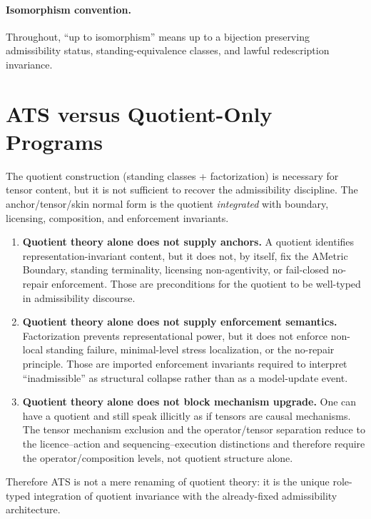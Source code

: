 \documentclass[12pt]{article}
\theoremstyle{plain}
\begin{document}
\paragraph{Isomorphism convention.}
Throughout, ``up to isomorphism'' means up to a bijection preserving admissibility status, standing-equivalence classes, and lawful redescription invariance.



\section{ATS versus Quotient-Only Programs}

The quotient construction (standing classes + factorization) is necessary for tensor content, but it is not sufficient to recover the admissibility discipline. The anchor/tensor/skin normal form is the quotient \emph{integrated} with boundary, licensing, composition, and enforcement invariants.

\begin{enumerate}[leftmargin=*]
\item \textbf{Quotient theory alone does not supply anchors.} A quotient identifies representation-invariant content, but it does not, by itself, fix the AMetric Boundary, standing terminality, licensing non-agentivity, or fail-closed no-repair enforcement. Those are preconditions for the quotient to be well-typed in admissibility discourse.

\item \textbf{Quotient theory alone does not supply enforcement semantics.} Factorization prevents representational power, but it does not enforce non-local standing failure, minimal-level stress localization, or the no-repair principle. Those are imported enforcement invariants required to interpret ``inadmissible'' as structural collapse rather than as a model-update event.

\item \textbf{Quotient theory alone does not block mechanism upgrade.} One can have a quotient and still speak illicitly as if tensors are causal mechanisms. The tensor mechanism exclusion and the operator/tensor separation reduce to the licence--action and sequencing--execution distinctions and therefore require the operator/composition levels, not quotient structure alone.
\end{enumerate}

Therefore ATS is not a mere renaming of quotient theory: it is the unique role-typed integration of quotient invariance with the already-fixed admissibility architecture.
\end{document}
